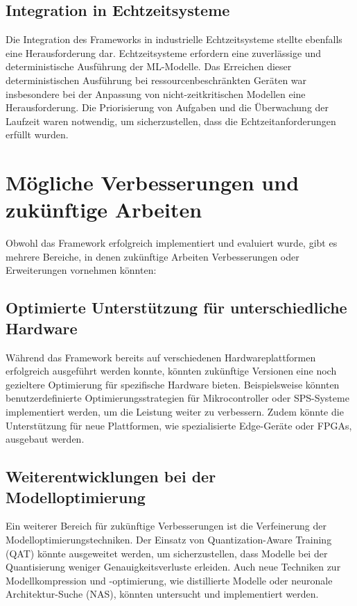 \subsection{Integration in Echtzeitsysteme}
Die Integration des Frameworks in industrielle Echtzeitsysteme stellte ebenfalls eine Herausforderung dar. Echtzeitsysteme erfordern eine 
zuverlässige und deterministische Ausführung der ML-Modelle. Das Erreichen dieser deterministischen Ausführung bei ressourcenbeschränkten Geräten 
war insbesondere bei der Anpassung von nicht-zeitkritischen Modellen eine Herausforderung. Die Priorisierung von Aufgaben und die 
Überwachung der Laufzeit waren notwendig, um sicherzustellen, dass die Echtzeitanforderungen erfüllt wurden.

\section{Mögliche Verbesserungen und zukünftige Arbeiten}
Obwohl das Framework erfolgreich implementiert und evaluiert wurde, gibt es mehrere Bereiche, in denen zukünftige Arbeiten 
Verbesserungen oder Erweiterungen vornehmen könnten:

\subsection{Optimierte Unterstützung für unterschiedliche Hardware}
Während das Framework bereits auf verschiedenen Hardwareplattformen erfolgreich ausgeführt werden konnte, könnten zukünftige Versionen 
eine noch gezieltere Optimierung für spezifische Hardware bieten. Beispielsweise könnten benutzerdefinierte Optimierungsstrategien 
für Mikrocontroller oder SPS-Systeme implementiert werden, um die Leistung weiter zu verbessern. Zudem könnte die Unterstützung für neue Plattformen, 
wie spezialisierte Edge-Geräte oder FPGAs, ausgebaut werden.

\subsection{Weiterentwicklungen bei der Modelloptimierung}
Ein weiterer Bereich für zukünftige Verbesserungen ist die Verfeinerung der Modelloptimierungstechniken. 
Der Einsatz von Quantization-Aware Training (QAT) könnte ausgeweitet werden, um sicherzustellen, dass Modelle bei der Quantisierung weniger 
Genauigkeitsverluste erleiden. Auch neue Techniken zur Modellkompression und -optimierung, wie distillierte Modelle oder 
neuronale Architektur-Suche (NAS), könnten untersucht und implementiert werden.

